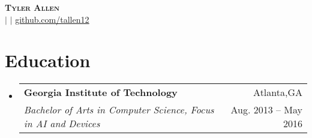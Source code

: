 \documentclass[letterpaper,10pt]{article}
\makeatletter
\newcommand{\resumeSubheading}[4]{
  \vspace{-2pt}\item
    \begin{tabular*}{0.97\textwidth}[t]{l@{\extracolsep{\fill}}r}
      \textbf{#1} & #2 \\
      \textit{\small#3} & {\small #4} \\
    \end{tabular*}\vspace{-7pt}
}
\newcommand{\resumeSubHeadingListStart}{\begin{itemize}[leftmargin=0.15in, label={}]}
\newcommand{\resumeSubHeadingListEnd}{\end{itemize}}
\makeatother
\begin{document}
\begin{center}
    \textbf{\Huge \scshape Tyler Allen} \\ \vspace{1pt}
    \small {\PhoneNumber} $|$ \href{mailto:{\EmailAddress}}{\underline{\EmailAddress}} $|$ 
    \href{https://github.com/tallen12}{\underline{github.com/tallen12}}
\end{center}


\section{Education}
  \resumeSubHeadingListStart
    \resumeSubheading
      {Georgia Institute of Technology}{Atlanta,GA}
      {Bachelor of Arts in Computer Science, Focus in AI and Devices}{Aug. 2013 -- May 2016}
  \resumeSubHeadingListEnd


\end{document}
